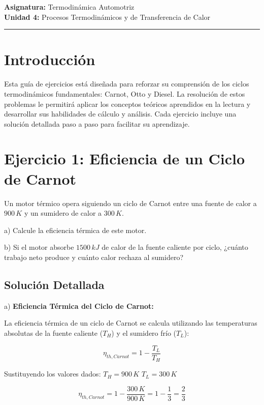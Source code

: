 \documentclass{article}
\begin{document}

\textbf{Asignatura:} Termodinámica Automotriz \\
\textbf{Unidad 4:} Procesos Termodinámicos y de Transferencia de Calor

\vspace{5mm}
\hrule
\vspace{5mm}

\section*{Introducción}

Esta guía de ejercicios está diseñada para reforzar su comprensión de los ciclos termodinámicos fundamentales: Carnot, Otto y Diesel. La resolución de estos problemas le permitirá aplicar los conceptos teóricos aprendidos en la lectura y desarrollar sus habilidades de cálculo y análisis. Cada ejercicio incluye una solución detallada paso a paso para facilitar su aprendizaje.

\section*{Ejercicio 1: Eficiencia de un Ciclo de Carnot}

Un motor térmico opera siguiendo un ciclo de Carnot entre una fuente de calor a $900 \, K$ y un sumidero de calor a $300 \, K$.

a) Calcule la eficiencia térmica de este motor.

b) Si el motor absorbe $1500 \, kJ$ de calor de la fuente caliente por ciclo, ¿cuánto trabajo neto produce y cuánto calor rechaza al sumidero?

\subsection*{Solución Detallada}

a) \textbf{Eficiencia Térmica del Ciclo de Carnot:}

La eficiencia térmica de un ciclo de Carnot se calcula utilizando las temperaturas absolutas de la fuente caliente ($T_H$) y el sumidero frío ($T_L$):

$$ \eta_{th,Carnot} = 1 - \frac{T_L}{T_H} $$

Sustituyendo los valores dados:
$T_H = 900 \, K$
$T_L = 300 \, K$

$$ \eta_{th,Carnot} = 1 - \frac{300 \, K}{900 \, K} = 1 - \frac{1}{3} = \frac{2}{3} $$
\end{document}
